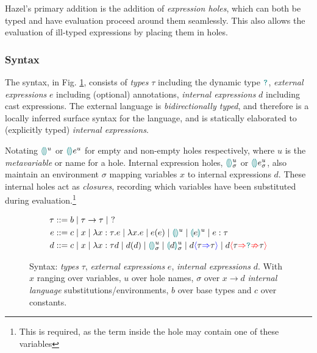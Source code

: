 Hazel's primary addition is the addition of \textit{expression holes}, which can both be typed and have evaluation proceed around them seamlessly. This also allows the evaluation of ill-typed expressions by placing them in holes.

\subsubsection{Syntax}
\par The syntax, in Fig. \ref{fig:syntax}, consists of \textit{types} $\tau$ including the dynamic type $\dyn$, \textit{external expressions} $e$ including (optional) annotations, \textit{internal expressions} $d$ including cast expressions. The external language is \textit{bidirectionally typed}, and therefore is a locally inferred surface syntax for the language, and is statically elaborated to (explicitly typed) \textit{internal expressions}.

Notating $\hole{}^u$ or $\hole{e}^u$ for empty and non-empty holes respectively, where $u$ is the \textit{metavariable} or name for a hole. Internal expression holes, $\hole{}^u_\sigma$ or $\hole{e}^u_\sigma$, also maintain an environment $\sigma$ mapping variables $x$ to internal expressions $d$. These internal holes act as \textit{closures}, recording which variables have been substituted during evaluation.\footnote{This is required, as the term inside the hole may contain one of these variables}
\begin{figure}[h]
\begin{align*}
\tau &::= b \mid \tau \to \tau \mid\  ?\\
e &::= c \mid x \mid \lambda x : \tau.e \mid \lambda x. e \mid e(e) \mid \hole^u \mid \hole[e]^u \mid e : \tau\\
d &::= c \mid x \mid \lambda x : \tau d \mid d(d) \mid \hole^u_\sigma \mid \hole[d]^u_\sigma \mid d\scast{\tau}{\tau} \mid d\scasterror{\tau}{\tau}
\end{align*}
\caption{Syntax: \textit{types} $\tau$, \textit{external expressions} $e$, \textit{internal expressions} $d$. With $x$ ranging over variables, $u$ over hole names, $\sigma$ over $x \to d$ \textit{internal language} substitutions/environments, $b$ over base types and $c$ over constants.}
\label{fig:syntax}
\end{figure}

